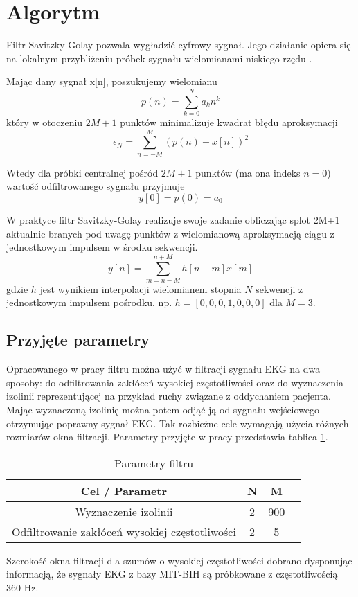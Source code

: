 \section{Algorytm}

Filtr Savitzky-Golay pozwala wygładzić cyfrowy sygnał. Jego działanie opiera się na lokalnym przybliżeniu próbek sygnału wielomianami niskiego rzędu \cite{whatissg}.

Mając dany sygnał x[n], poszukujemy wielomianu
\begin{equation}
p(n) = \sum\limits_{k=0}^N a_k n^k
\end{equation}
który w otoczeniu $2M+1$ punktów minimalizuje kwadrat błędu aproksymacji
\begin{equation}
\epsilon_N = \sum\limits_{n=-M}^M (p(n) - x[n])^2
\end{equation}

Wtedy dla próbki centralnej pośród $2M+1$ punktów (ma ona indeks $n=0$) wartość odfiltrowanego sygnału przyjmuje
\begin{equation}
y[0] = p(0) = a_0
\end{equation}

W praktyce filtr Savitzky-Golay realizuje swoje zadanie obliczając splot 2M+1 aktualnie branych pod uwagę punktów z wielomianową aproksymacją ciągu z jednostkowym impulsem w środku sekwencji.
\begin{equation}
y[n] = \sum\limits_{m=n-M}^{n+M} h[n-m] x[m]
\end{equation}
gdzie $h$ jest wynikiem interpolacji wielomianem stopnia $N$ sekwencji z jednostkowym impulsem pośrodku, np. $h = [0, 0, 0, 1, 0, 0, 0]$ dla $M=3$.


\subsection{Przyjęte parametry}
Opracowanego w pracy filtru można użyć w filtracji sygnału EKG na dwa sposoby: do odfiltrowania zakłóceń wysokiej częstotliwości oraz do wyznaczenia izolinii reprezentującej na przykład ruchy związane z oddychaniem pacjenta. Mając wyznaczoną izolinię można potem odjąć ją od sygnału wejściowego otrzymując poprawny sygnał EKG. Tak rozbieżne cele wymagają użycia różnych rozmiarów okna filtracji. Parametry przyjęte w pracy przedstawia tablica \ref{tab:params}.

\begin{table}[!htb]
  \centering
  \begin{tabular}{|c|c|c|c|}
  \hline 
  Cel / Parametr  & N & M \\  
  \hline 
  Wyznaczenie izolinii & 2 & 900 \\
  \hline
  Odfiltrowanie zakłóceń wysokiej częstotliwości & 2 & 5 \\
  \hline
\end{tabular} 
\caption{Parametry filtru}
\label{tab:params}
\end{table}

Szerokość okna filtracji dla szumów o wysokiej częstotliwości dobrano dysponując informacją, że sygnały EKG z bazy MIT-BIH są próbkowane z częstotliwością 360 Hz.
